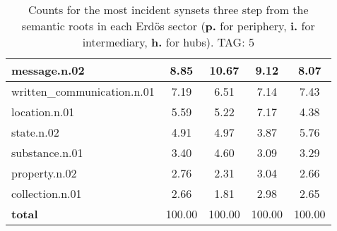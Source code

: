 \begin{table}[h!]
\begin{center}
\begin{tabular}{| l || c | c | c | c |}
message.n.02 & 8.85  & 10.67  & 9.12  & 8.07 \\\hline
written\_communication.n.01 & 7.19  & 6.51  & 7.14  & 7.43 \\\hline
location.n.01 & 5.59  & 5.22  & 7.17  & 4.38 \\\hline
state.n.02 & 4.91  & 4.97  & 3.87  & 5.76 \\\hline
substance.n.01 & 3.40  & 4.60  & 3.09  & 3.29 \\\hline
property.n.02 & 2.76  & 2.31  & 3.04  & 2.66 \\\hline
collection.n.01 & 2.66  & 1.81  & 2.98  & 2.65 \\\hline\hline
{{\bf total}} & 100.00  & 100.00  & 100.00  & 100.00 \\\hline
\end{tabular}
\caption{Counts for the most incident synsets three step from the semantic roots in each Erd\"os sector ({\bf p.} for periphery, {\bf i.} for intermediary, {\bf h.} for hubs). TAG: 5}
\end{center}
\end{table}